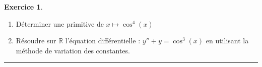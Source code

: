 \documentclass[a4paper,10pt]{article}
\theoremstyle{definition}
\theoremstyle{definition}
\newtheorem{exo}{Exercice}
\newcommand{\R}{\mathbb{R}}
\begin{document}
\begin{exo}\quad\\[0.25cm]
	\begin{enumerate}
		\item Déterminer une primitive de $x\longmapsto\cos^4(x)$
		\item Résoudre sur $\R$ l’équation différentielle : $y'' + y = \cos^3(x)$  en utilisant la méthode de variation des
		constantes.
	\end{enumerate}
	
	\centering
	\rule{1\linewidth}{0.6pt}
\end{exo}
\end{document}
